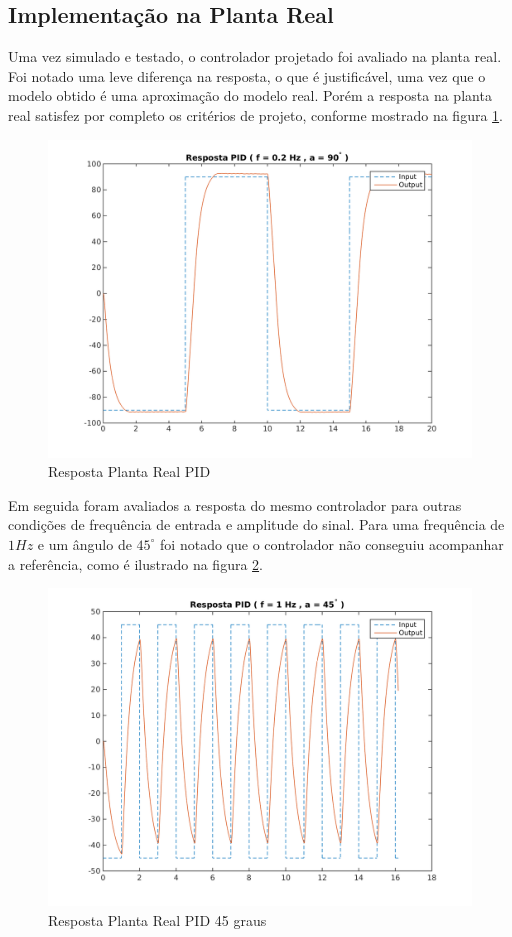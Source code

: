 \documentclass[a4paper,11pt]{article}
\begin{document}

\subsection{Implementação na Planta Real}

Uma vez simulado e testado, o controlador projetado foi avaliado na planta real. Foi notado uma leve diferença na resposta, o que é justificável, uma vez que o modelo obtido é uma aproximação do modelo real. Porém a resposta na planta real satisfez por completo os critérios de projeto, conforme mostrado na figura \ref{fig:quaser_pid}.

\begin{figure}[H]
    \centering
    \includegraphics[width=0.8\linewidth]{tex/img/quanserpid_s90num5.png}
    \caption{Resposta Planta Real PID}
    \label{fig:quaser_pid}
\end{figure}

Em seguida foram avaliados a resposta do mesmo controlador para outras condições de frequência de entrada e amplitude do sinal. Para uma frequência de $1Hz$ e um ângulo de $45^\circ$ foi notado que o controlador não conseguiu acompanhar a referência, como é ilustrado na figura \ref{fig:quanserpid_s45num1}.

\begin{figure}[H]
    \centering
    \includegraphics[width=0.8\linewidth]{tex/img/quanserpid_s45num1.png}
    \caption{Resposta Planta Real PID 45 graus}
    \label{fig:quanserpid_s45num1}
\end{figure}
\end{document}
